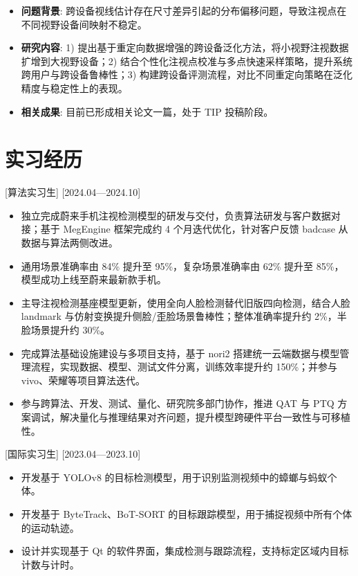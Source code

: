 \documentclass{resume-photo}
\begin{document}
\begin{itemize}
  \item \textbf{问题背景}: 跨设备视线估计存在尺寸差异引起的分布偏移问题，导致注视点在不同视野设备间映射不稳定。
  \item \textbf{研究内容}: 1) 提出基于重定向数据增强的跨设备泛化方法，将小视野注视数据扩增到大视野设备；2) 结合个性化注视点校准与多点快速采样策略，提升系统跨用户与跨设备鲁棒性；3) 构建跨设备评测流程，对比不同重定向策略在泛化精度与稳定性上的表现。
  \item \textbf{相关成果}: 目前已形成相关论文一篇，处于 TIP 投稿阶段。
\end{itemize}


\section{实习经历}

[\textnormal{算法实习生}]
[2024.04—2024.10]

\begin{itemize}
  \item 独立完成蔚来手机注视检测模型的研发与交付，负责算法研发与客户数据对接；基于 MegEngine 框架完成约 4 个月迭代优化，针对客户反馈 badcase 从数据与算法两侧改进。
  \item 通用场景准确率由 84\% 提升至 95\%，复杂场景准确率由 62\% 提升至 85\%，模型成功上线至蔚来最新款手机。
  \item 主导注视检测基座模型更新，使用全向人脸检测替代旧版四向检测，结合人脸 landmark 与仿射变换提升侧脸/歪脸场景鲁棒性；整体准确率提升约 2\%，半脸场景提升约 30\%。
  \item 完成算法基础设施建设与多项目支持，基于 nori2 搭建统一云端数据与模型管理流程，实现数据、模型、测试文件分离，训练效率提升约 150\%；并参与 vivo、荣耀等项目算法迭代。
  \item 参与跨算法、开发、测试、量化、研究院多部门协作，推进 QAT 与 PTQ 方案调试，解决量化与推理结果对齐问题，提升模型跨硬件平台一致性与可移植性。
\end{itemize}

[\textnormal{国际实习生}]
[2023.04—2023.10]

\begin{itemize}
  \item 开发基于 YOLOv8 的目标检测模型，用于识别监测视频中的蟑螂与蚂蚁个体。
  \item 开发基于 ByteTrack、BoT-SORT 的目标跟踪模型，用于捕捉视频中所有个体的运动轨迹。
  \item 设计并实现基于 Qt 的软件界面，集成检测与跟踪流程，支持标定区域内目标计数与计时。
\end{itemize}
\end{document}
